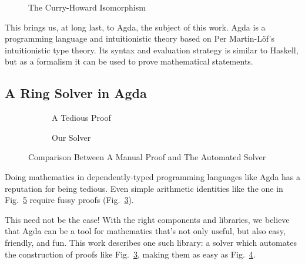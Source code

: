 \documentclass[12pt]{article}
\begin{document}
\begin{figure}
  \centering
  \caption{The Curry-Howard Isomorphism}
  \label{CH}
\end{figure}
This brings us, at long last, to Agda, the subject of this work.
Agda is a programming language and intuitionistic theory based on Per
Martin-Löf's intuitionistic type theory.
Its syntax and evaluation strategy is similar to Haskell, but as a formalism it
can be used to prove mathematical statements.

\newpage
\subsection{A Ring Solver in Agda}

\begin{figure}
  \centering
  \begin{subfigure}[b]{\textwidth}
    \centering
    \label{ring-lemma}
    \vspace{-10pt}
  \end{subfigure}
  \begin{subfigure}[b]{.5\textwidth}
    \caption{A Tedious Proof}
    \label{ring-proof}
  \end{subfigure}%
  \begin{subfigure}[b]{.3\textwidth}
    \centering
    \caption{Our Solver}
    \label{the-solver}
  \end{subfigure}
  \caption{Comparison Between A Manual Proof and The Automated Solver}
  \label{comparison}
\end{figure}
Doing mathematics in dependently-typed programming languages like Agda has a
reputation for being tedious. Even simple arithmetic identities like the one in
Fig.~\ref{comparison} require fussy proofs (Fig.~\ref{ring-proof}).

This need not be the case! With the right components and libraries, we believe
that Agda can be a tool for mathematics that's not only useful, but also easy,
friendly, and fun. This work describes one such library: a solver which
automates the construction of proofs like Fig.~\ref{ring-proof}, making them as
easy as Fig.~\ref{the-solver}.
\end{document}
